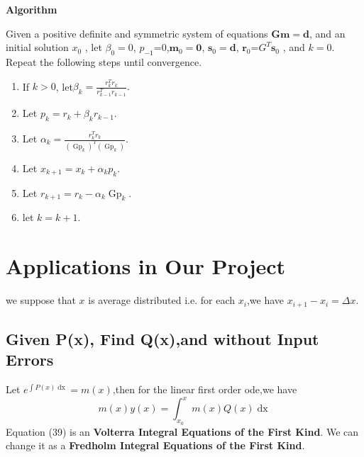 \documentclass[a4paper]{article}
\newcommand{\tmem}[1]{{\em #1\/}}
\newcommand{\tmmathbf}[1]{\ensuremath{\boldsymbol{#1}}}
\newcommand{\tmop}[1]{\ensuremath{\operatorname{#1}}}
\newcommand{\tmstrong}[1]{\textbf{#1}}
\newcommand{\tmtextbf}[1]{{\bfseries{#1}}}
\newcommand{\tmtextup}[1]{{\upshape{#1}}}
\newenvironment{enumeratenumeric}{\begin{enumerate}[1.] }{\end{enumerate}}
\newenvironment{tmindent}{\begin{tmparmod}{1.5em}{0pt}{0pt} }{\end{tmparmod}}
\newenvironment{tmparmod}[3]{\begin{list}{}{\setlength{\topsep}{0pt}\setlength{\leftmargin}{#1}\setlength{\rightmargin}{#2}\setlength{\parindent}{#3}\setlength{\listparindent}{\parindent}\setlength{\itemindent}{\parindent}\setlength{\parsep}{\parskip}} \item[]}{\end{list}}
\newenvironment{tmparsep}[1]{\begingroup\setlength{\parskip}{#1}}{\endgroup}
\begin{document}
{\noindent}\begin{tmparsep}{0em}
  \tmtextbf{Algorithm \tmtextup{5}}{\smallskip}
  \begin{tmindent}
    Given a positive definite and symmetric system of equations
    $\tmmathbf{G}\tmmathbf{m}=\tmmathbf{d}$, and an initial solution $x_0$ ,
    let $\beta_0 = 0$, {\tmstrong{$p_{- 1}$}}=0,{\tmem{$\tmmathbf{m}_0
    =\tmmathbf{0}$}}, $\tmmathbf{s}_0 =\tmmathbf{d}$, $\tmmathbf{r}_0$=$G^T
    \tmmathbf{s}_0$ , and $k = 0$. Repeat the following steps until
    convergence.
    \begin{enumeratenumeric}
      \item If $k > 0$, let$\beta_k = \frac{r_k^T r_k}{r_{k - 1}^T r_{k - 1}}
      .$

      \item Let $p_k = r_k + \beta_k r_{k - 1} .$

      \item Let $\alpha_k = \frac{r_k^T r_k}{\left( \tmop{Gp}_k \right)^T
      \left( \tmop{Gp}_k \right)} .$

      \item Let $x_{k + 1} = x_k + \alpha_k p_k .$

      \item Let $r_{k + 1} = r_k - \alpha_k \tmop{Gp}_k$.

      \item let $k = k + 1$.
    \end{enumeratenumeric}
  \end{tmindent}
\end{tmparsep}{\hspace*{\fill}}{\medskip}


\section{Applications in Our Project}

we suppose that $x$ is average distributed i.e. for each $x_i$,we have $x_{i +
1} - x_i = \Delta x$.

\subsection{Given P(x), Find Q(x),and without Input Errors}

Let $e^{\int P \left( x \right) \tmop{dx}} = m \left( x \right)$,then for the
linear first order ode,we have
\begin{equation}
  m \left( x \right) y \left( x \right) = \int_{x_0}^x m \left( x \right) Q
  \left( x \right) \tmop{dx}
\end{equation}
Equation (39) is an {\tmstrong{Volterra Integral Equations of the First
Kind}}. We can change it as a {\tmstrong{Fredholm Integral Equations of the
First Kind}}.
\end{document}

